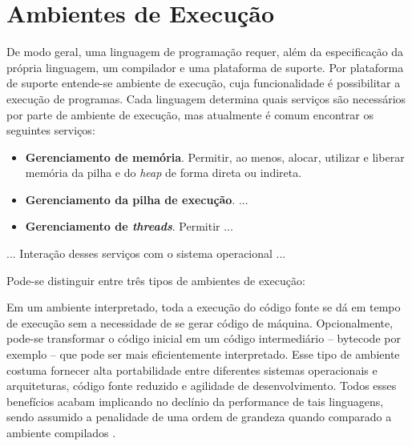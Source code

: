 \chapter{Ambientes de Execução}




De modo geral, uma linguagem de programação requer, além da
especificação da própria linguagem, um compilador e uma plataforma de
suporte. Por plataforma de suporte entende-se ambiente de execução,
cuja funcionalidade é possibilitar a execução de programas. Cada
linguagem determina quais serviços são necessários por
parte de ambiente de execução, mas atualmente é comum encontrar os
seguintes serviços:
\begin{itemize}
\item \textbf{Gerenciamento de memória}. Permitir, ao menos, alocar,
  utilizar e liberar memória da pilha e do \textit{heap} de forma
  direta ou indireta.
\item \textbf{Gerenciamento da pilha de execução}. ...
\item \textbf{Gerenciamento de \textit{threads}}. Permitir ...
\end{itemize}
... Interação desses serviços com o sistema operacional ...


Pode-se distinguir entre três tipos de ambientes de execução: 


Em um ambiente interpretado, toda a execução do código fonte se dá em
tempo de execução sem a necessidade de se gerar código de máquina.
Opcionalmente, pode-se transformar o código inicial
em um código intermediário -- bytecode por exemplo -- que pode ser mais
eficientemente interpretado. Esse tipo de ambiente costuma fornecer
alta portabilidade entre diferentes sistemas operacionais e
arquiteturas, código fonte reduzido e agilidade de
desenvolvimento. Todos esses benefícios acabam implicando no declínio
da performance de tais linguagens, sendo assumido a penalidade de uma
ordem de grandeza quando comparado a ambiente compilados
 \cite{jit_eq_betterlate}.

